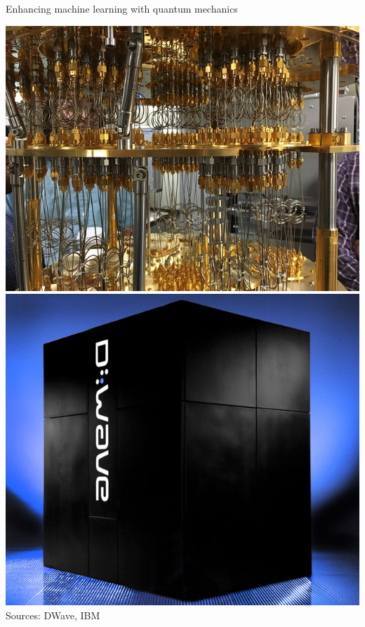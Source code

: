 \documentclass[10pt]{beamer}
\begin{document}
{
\begin{frame}[fragile]{Enhancing machine learning with quantum mechanics}
\hspace{-0.7cm}
\begin{minipage}[c]{0.59\textwidth}
\includegraphics[scale=0.13]{ibm-quantum-computer.jpg}
\includegraphics[scale=0.12]{dwave.jpg}\\
\tiny{Sources: DWave, IBM}
\vspace{0.1cm}
\normalsize
\begin{itemize}

\end{itemize}
\end{minipage}
\end{frame}}
\end{document}

